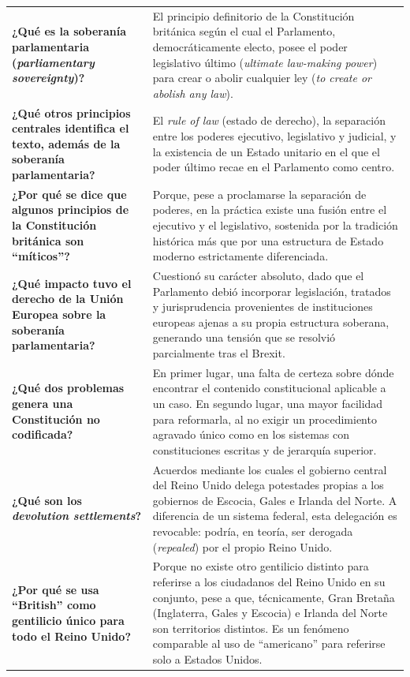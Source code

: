 \documentclass[12pt,oneside]{book}
\begin{document}
\begin{longtable}{
    >{\raggedright\arraybackslash}p{}
    >{\raggedright\arraybackslash}p{}
}
\textbf{¿Qué es la soberanía parlamentaria (\emph{parliamentary sovereignty})?} &
El principio definitorio de la Constitución británica según el cual el Parlamento, democráticamente electo, posee el poder legislativo último (\emph{ultimate law-making power}) para crear o abolir cualquier ley (\emph{to create or abolish any law}). \\

\textbf{¿Qué otros principios centrales identifica el texto, además de la soberanía parlamentaria?} &
El \emph{rule of law} (estado de derecho), la separación entre los poderes ejecutivo, legislativo y judicial, y la existencia de un Estado unitario en el que el poder último recae en el Parlamento como centro. \\

\textbf{¿Por qué se dice que algunos principios de la Constitución británica son ``míticos''?} &
Porque, pese a proclamarse la separación de poderes, en la práctica existe una fusión entre el ejecutivo y el legislativo, sostenida por la tradición histórica más que por una estructura de Estado moderno estrictamente diferenciada. \\

\textbf{¿Qué impacto tuvo el derecho de la Unión Europea sobre la soberanía parlamentaria?} &
Cuestionó su carácter absoluto, dado que el Parlamento debió incorporar legislación, tratados y jurisprudencia provenientes de instituciones europeas ajenas a su propia estructura soberana, generando una tensión que se resolvió parcialmente tras el Brexit. \\

\textbf{¿Qué dos problemas genera una Constitución no codificada?} &
En primer lugar, una falta de certeza sobre dónde encontrar el contenido constitucional aplicable a un caso. En segundo lugar, una mayor facilidad para reformarla, al no exigir un procedimiento agravado único como en los sistemas con constituciones escritas y de jerarquía superior. \\

\textbf{¿Qué son los \emph{devolution settlements}?} &
Acuerdos mediante los cuales el gobierno central del Reino Unido delega potestades propias a los gobiernos de Escocia, Gales e Irlanda del Norte. A diferencia de un sistema federal, esta delegación es revocable: podría, en teoría, ser derogada (\emph{repealed}) por el propio Reino Unido. \\

\textbf{¿Por qué se usa ``British'' como gentilicio único para todo el Reino Unido?} &
Porque no existe otro gentilicio distinto para referirse a los ciudadanos del Reino Unido en su conjunto, pese a que, técnicamente, Gran Bretaña (Inglaterra, Gales y Escocia) e Irlanda del Norte son territorios distintos. Es un fenómeno comparable al uso de ``americano'' para referirse solo a Estados Unidos. \\


\end{longtable}
\end{document}
